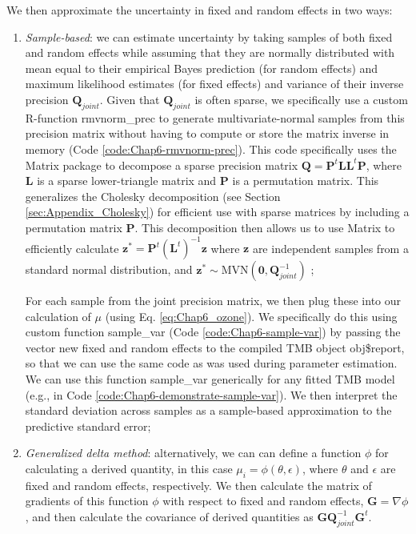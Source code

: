 We then approximate the uncertainty in fixed and random effects in two ways:
\begin{enumerate}
    \item \textit{Sample-based}: we can estimate uncertainty by taking samples of both fixed and random effects while assuming that they are normally distributed with mean equal to their empirical Bayes prediction (for random effects) and maximum likelihood estimates (for fixed effects) and variance of their inverse precision \(\mathbf{Q}_{joint}\).  Given that \(\mathbf Q_{joint}\) is often sparse, we specifically use a custom R-function \colorbox{backcolour}{rmvnorm\_prec} to generate multivariate-normal samples from this precision matrix without having to compute or store the matrix inverse in memory (Code \ref{code:Chap6-rmvnorm-prec}).  This code specifically uses the \colorbox{backcolour}{Matrix} package \cite{bates_matrix_2023} to decompose a sparse precision matrix \( \mathbf{Q = P}^t \mathbf{L} \mathbf{L}^t \mathbf{P} \), where \(\mathbf{L}\) is a sparse lower-triangle matrix and \(\mathbf{P}\) is a permutation matrix.  This generalizes the Cholesky decomposition (see Section \ref{sec:Appendix_Cholesky}) for efficient use with sparse matrices by including a permutation matrix \( \mathbf{P}\). This decomposition then allows us to use \colorbox{backcolour}{Matrix} to efficiently calculate \( \mathbf{z}^{\ast} = \mathbf{P}^t (\mathbf{L}^t)^{-1} \mathbf{z} \) where \(\mathbf{z}\) are independent samples from a standard normal distribution, and \( \mathbf{z}^{\ast} \sim \mathrm{MVN}(\mathbf{0,Q}_{joint}^{-1}) \) \cite{rue_gaussian_2005};
    
    For each sample from the joint precision matrix, we then plug these into our calculation of \( \mu \) (using Eq. \ref{eq:Chap6_ozone}).  We specifically do this using custom function \colorbox{backcolour}{sample\_var} (Code \ref{code:Chap6-sample-var}) by passing the vector new fixed and random effects to the compiled TMB object \colorbox{backcolour}{obj\$report}, so that we can use the same code as was used during parameter estimation.  We can use this function \colorbox{backcolour}{sample\_var} generically for any fitted TMB model (e.g., in Code \ref{code:Chap6-demonstrate-sample-var}).  We then interpret the standard deviation across samples as a sample-based approximation to the predictive standard error;  

    \item \textit{Generalized delta method}: alternatively, we can can define a function \(\phi\) for calculating a derived quantity, in this case \( \mu_i = \phi(\theta,\epsilon) \), where \( \theta \) and \( \epsilon \) are fixed and random effects, respectively.  We then calculate the matrix of gradients of this function \( \phi \) with respect to fixed and random effects, \( \mathbf G = \nabla \phi \), and then calculate the covariance of derived quantities as \( \mathbf{ G Q}_{joint}^{-1} \mathbf G^t \).  
\end{enumerate}
